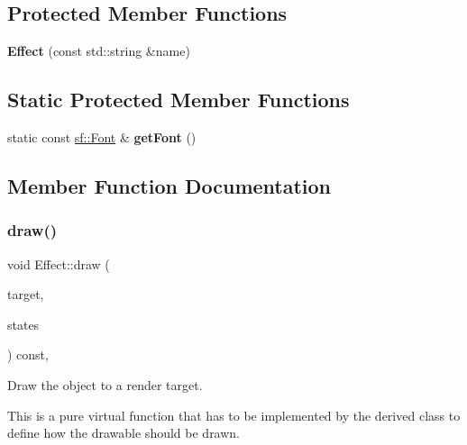 \subsection*{Protected Member Functions}
\begin{DoxyCompactItemize}
\item 
\mbox{\label{class_effect_a6c1c4ec803a1aa5dcbd34a6cf92fd8d5}} 
{\bfseries Effect} (const std\+::string \&name)
\end{DoxyCompactItemize}
\subsection*{Static Protected Member Functions}
\begin{DoxyCompactItemize}
\item 
\mbox{\label{class_effect_a406376adb93215da98a51e7eeb4658e6}} 
static const \hyperlink{classsf_1_1_font}{sf\+::\+Font} \& {\bfseries get\+Font} ()
\end{DoxyCompactItemize}


\subsection{Member Function Documentation}
\mbox{\label{class_effect_a6a3a393e127581c7f84e1278b5be0438}} 
\subsubsection{\texorpdfstring{draw()}{draw()}}
{\footnotesize\ttfamily void Effect\+::draw (\begin{DoxyParamCaption}\item[{\hyperlink{classsf_1_1_render_target}{sf\+::\+Render\+Target} \&}]{target,  }\item[{\hyperlink{classsf_1_1_render_states}{sf\+::\+Render\+States}}]{states }\end{DoxyParamCaption}) const\hspace{0.3cm}{\ttfamily [inline]}, {\ttfamily [virtual]}}



Draw the object to a render target. 

This is a pure virtual function that has to be implemented by the derived class to define how the drawable should be drawn.


